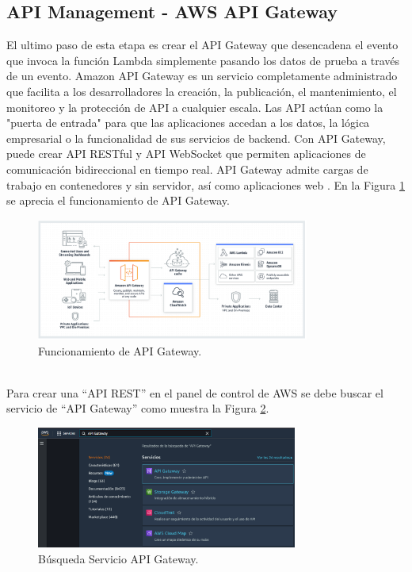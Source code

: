 \documentclass[a4paper,10pt, oneside, titlepage]{article}
\begin{document}
	\subsection{API Management - AWS API Gateway}\label{AWS_Gateway_API}
	El ultimo paso de esta etapa es crear el API Gateway que desencadena el evento que invoca la función Lambda simplemente pasando los datos de prueba a través de un evento. Amazon API Gateway es un servicio completamente administrado que facilita a los desarrolladores la creación, la publicación, el mantenimiento, el monitoreo y la protección de API a cualquier escala. Las API actúan como la "puerta de entrada" para que las aplicaciones accedan a los datos, la lógica empresarial o la funcionalidad de sus servicios de backend. Con API Gateway, puede crear API RESTful y API WebSocket que permiten aplicaciones de comunicación bidireccional en tiempo real. API Gateway admite cargas de trabajo en contenedores y sin servidor, así como aplicaciones web \cite{Gateway}. En la Figura \ref{Funcionamiento_Gateway} se aprecia el funcionamiento de API Gateway.
	\begin{figure}[!h]
		\centering
		\includegraphics[width = 1\linewidth, height = 4cm]{Funcionamiento_Gateway.png}
		\caption{Funcionamiento de API Gateway.}
		\label{Funcionamiento_Gateway}
	\end{figure} \\
	\indent Para crear una ``API REST'' en el panel de control de AWS se debe buscar el servicio de ``API Gateway'' como muestra la Figura \ref{Servicio_Gateway}.
	\begin{figure}[!h]
		\centering
		\includegraphics[width = 1\linewidth, height = 4cm]{Servicio_Gateway.png}
		\caption{Búsqueda Servicio API Gateway.}
		\label{Servicio_Gateway}
	\end{figure} \\
\end{document}
